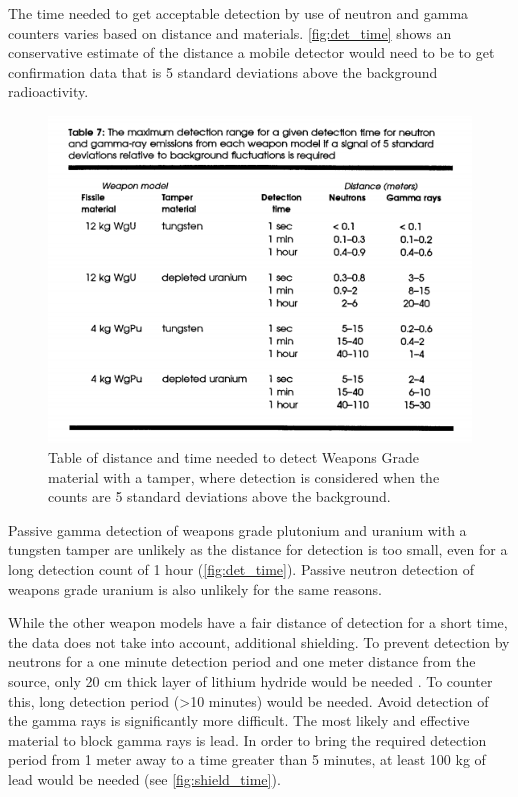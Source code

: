 \documentclass{report}
\begin{document}
The time needed to get acceptable detection by use of neutron and gamma counters varies based on distance and materials. \autoref{fig:det_time} shows an conservative estimate of the distance a mobile detector would need to be to get confirmation data that is 5 standard deviations above the background radioactivity. 


\begin{figure}
 \centering
 \includegraphics[trim = 0cm 0cm 0cm 2cm, clip,scale=0.6]{./figures/det_time.png}
   \caption{Table of distance and time needed to detect Weapons Grade  material with a tamper, where detection is considered when the counts are 5 standard deviations above the background. \cite{Fetter1990}}
     \label{fig:det_time}
\end{figure}


Passive gamma detection of weapons grade plutonium and uranium with a tungsten tamper are unlikely as the distance for detection is too small, even for a long detection count of 1 hour (\autoref{fig:det_time}). Passive neutron detection of weapons grade uranium is also unlikely for the same reasons. 


While the other weapon models have a fair distance of detection for a short time, the data does not take into account, additional shielding. To prevent detection by neutrons for a one minute detection period and one meter distance from the source, only 20 cm thick layer of lithium hydride would be needed \cite{Fetter1990}. To counter this, long detection period (\textgreater 10 minutes) \cite{Fetter1990} would be needed. Avoid detection of the gamma rays is significantly more difficult. The most likely and effective material to block gamma rays is lead. In order to bring the required detection period from 1 meter away to a time greater than 5 minutes, at least 100 kg of lead would be needed (see \autoref{fig:shield_time}).
\end{document}
